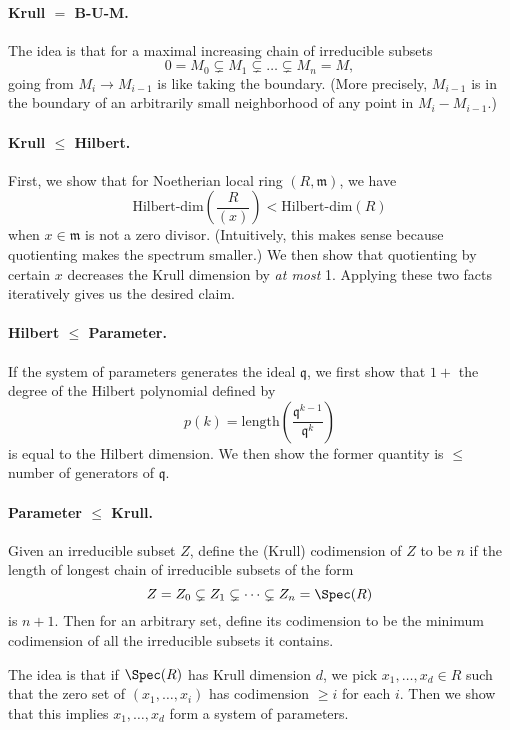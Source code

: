 \paragraph{Krull $=$ B-U-M.} The idea is that for a maximal increasing chain of irreducible subsets
\[
    0 = M_0 \subsetneq M_1 \subsetneq \dots \subsetneq M_n = M,
\]
going from $M_i \to M_{i - 1}$ is like taking the boundary. (More precisely, $M_{i-1}$ is in the boundary of an arbitrarily small neighborhood of any point in $M_i - M_{i-1}$.)

\paragraph{Krull $\le$ Hilbert.} First, we show that for Noetherian local ring $(R, \mathfrak m)$, we have
\[
    \text{Hilbert-dim}\left( \frac{R}{(x)} \right) < \text{Hilbert-dim}\left( R \right)
\]
when $x \in \mathfrak m$ is not a zero divisor. (Intuitively, this makes sense because quotienting makes the spectrum smaller.) We then show that quotienting by certain $x$ decreases the Krull dimension by \textit{at most} 1. Applying these two facts iteratively gives us the desired claim.

\paragraph{Hilbert $\le$ Parameter.} If the system of parameters generates the ideal $\mathfrak q$, we first show that $1 +$ the degree of the Hilbert polynomial defined by
\[
    p(k) = \text{length}\left( \frac{\mathfrak q^{k-1}}{\mathfrak q^{k}} \right)
\]
is equal to the Hilbert dimension. We then show the former quantity is $\le$ number of generators of $\mathfrak q$.

\paragraph{Parameter $\le$ Krull.} Given an irreducible subset $Z$, define the (Krull) codimension of $Z$ to be $n$ if the length of longest chain of irreducible subsets of the form
\[
    Z = Z_0 \subsetneq Z_1 \subsetneq \dots \subsetneq Z_n = \Spec(R)
\]
is $n + 1$. Then for an arbitrary set, define its codimension to be the minimum codimension of all the irreducible subsets it contains.

The idea is that if $\Spec(R)$ has Krull dimension $d$, we pick $x_1, \dots, x_d \in R$ such that the zero set of $(x_1, \dots, x_i)$ has codimension $\ge i$ for each $i$. Then we show that this implies $x_1, \dots, x_d$ form a system of parameters.

